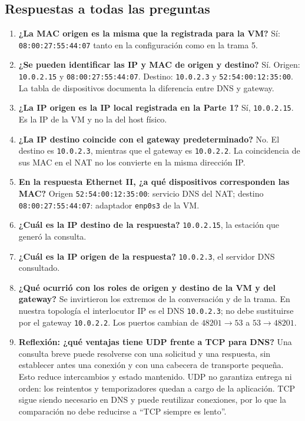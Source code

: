 \documentclass[11pt,a4paper]{article}
\begin{document}
\subsection{Respuestas a todas las preguntas}
\label{sec:respuestas2}
\begin{enumerate}[label=\textbf{\arabic*.},leftmargin=*]
\item \textbf{¿La MAC origen es la misma que la registrada para la VM?}
Sí: \texttt{08:00:27:55:44:07} tanto en la configuración como en la trama 5.

\item \textbf{¿Se pueden identificar las IP y MAC de origen y destino?}
Sí. Origen: \nolinkurl{10.0.2.15} y \texttt{08:00:27:55:44:07}.
Destino: \nolinkurl{10.0.2.3} y \texttt{52:54:00:12:35:00}. La tabla de
dispositivos documenta la diferencia entre DNS y gateway.

\item \textbf{¿La IP origen es la IP local registrada en la Parte 1?}
Sí, \nolinkurl{10.0.2.15}. Es la IP de la VM y no la del host físico.

\item \textbf{¿La IP destino coincide con el gateway predeterminado?}
No. El destino es \nolinkurl{10.0.2.3}, mientras que el gateway es
\nolinkurl{10.0.2.2}. La coincidencia de sus MAC en el NAT no los convierte
en la misma dirección IP.

\item \textbf{En la respuesta Ethernet II, ¿a qué dispositivos corresponden
las MAC?} Origen \texttt{52:54:00:12:35:00}: servicio DNS del NAT;
destino \texttt{08:00:27:55:44:07}: adaptador \texttt{enp0s3} de la VM.

\item \textbf{¿Cuál es la IP destino de la respuesta?}
\nolinkurl{10.0.2.15}, la estación que generó la consulta.

\item \textbf{¿Cuál es la IP origen de la respuesta?}
\nolinkurl{10.0.2.3}, el servidor DNS consultado.

\item \textbf{¿Qué ocurrió con los roles de origen y destino de la VM y
del gateway?} Se invirtieron los extremos de la conversación y de la trama.
En nuestra topología el interlocutor IP es el DNS \nolinkurl{10.0.2.3}; no
debe sustituirse por el gateway \nolinkurl{10.0.2.2}. Los puertos cambian de
$48201\rightarrow53$ a $53\rightarrow48201$.

\item \textbf{Reflexión: ¿qué ventajas tiene UDP frente a TCP para DNS?}
Una consulta breve puede resolverse con una solicitud y una respuesta, sin
establecer antes una conexión y con una cabecera de transporte pequeña.
Esto reduce intercambios y estado mantenido. UDP no garantiza entrega ni
orden: los reintentos y temporizadores quedan a cargo de la aplicación.
TCP sigue siendo necesario en DNS y puede reutilizar conexiones, por lo que
la comparación no debe reducirse a ``TCP siempre es lento''.
\end{enumerate}
\end{document}
